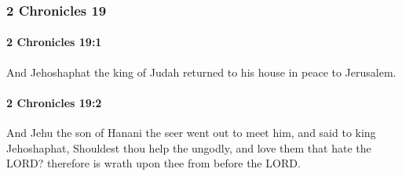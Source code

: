 	\subsubsection{2 Chronicles 19} %
		\label{2CHRONICLES-19}

		\paragraph{2 Chronicles 19:1} %
			\label{2CHRONICLES-19-1}

			And Jehoshaphat the king of Judah returned to his house in peace to Jerusalem.


		\paragraph{2 Chronicles 19:2} %
			\label{2CHRONICLES-19-2}

			And Jehu the son of Hanani the seer went out to meet him, and said to king Jehoshaphat, Shouldest thou help the ungodly, and love them that hate the LORD? therefore is wrath upon thee from before the LORD.

